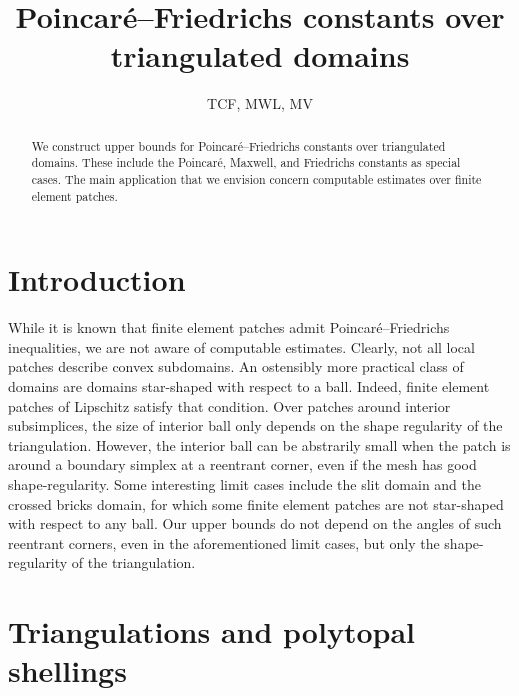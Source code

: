 \documentclass[a4paper]{article}
\title{Poincar\'e--Friedrichs constants over triangulated domains}
\author{TCF, MWL, MV}
\begin{document}
\maketitle

\begin{abstract}
    We construct upper bounds for Poincar\'e--Friedrichs constants over triangulated domains. 
    These include the Poincar\'e, Maxwell, and Friedrichs constants as special cases. 
    The main application that we envision concern computable estimates over finite element patches. 
\end{abstract}

\section{Introduction}
\cite{ern2021finite}






While it is known that finite element patches admit Poincar\'e--Friedrichs inequalities, 
we are not aware of computable estimates. 
Clearly, not all local patches describe convex subdomains. 
An ostensibly more practical class of domains are domains star-shaped with respect to a ball.
Indeed, finite element patches of Lipschitz satisfy that condition. 
Over patches around interior subsimplices, the size of interior ball only depends on the shape regularity of the triangulation. However, the interior ball can be abstrarily small when the patch is around a boundary simplex at a reentrant corner, even if the mesh has good shape-regularity. 
Some interesting limit cases include the slit domain and the crossed bricks domain,
for which some finite element patches are not star-shaped with respect to any ball. 
\color{red}Our upper bounds do not depend on the angles of such reentrant corners, even in the aforementioned limit cases, but only the shape-regularity of the triangulation. \color{black}


\section{Triangulations and polytopal shellings}
\end{document}
